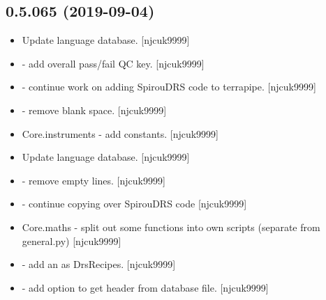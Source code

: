 \documentclass[a4paper,10pt,english]{report}
\begin{document}
\subsection{0.5.065 (2019-09-04)}
\label{\detokenize{misc/changelog:id78}}\begin{itemize}
\item {} 
Update language database. {[}njcuk9999{]}

\item {} 
 - add overall pass/fail QC key. {[}njcuk9999{]}

\item {} 
 - continue work on adding SpirouDRS code to terrapipe.
{[}njcuk9999{]}

\item {} 
 - remove blank space. {[}njcuk9999{]}

\item {} 
Core.instruments - add  constants. {[}njcuk9999{]}

\item {} 
Update language database. {[}njcuk9999{]}

\item {} 
 - remove empty lines. {[}njcuk9999{]}

\item {} 
 - continue copying over SpirouDRS code
 {[}njcuk9999{]}

\item {} 
Core.maths - split out some functions into own scripts (separate from
general.py) {[}njcuk9999{]}

\item {} 
 - add  an  as
DrsRecipes. {[}njcuk9999{]}

\item {} 
 - add option to get header from database
file. {[}njcuk9999{]}

\end{itemize}
\end{document}
